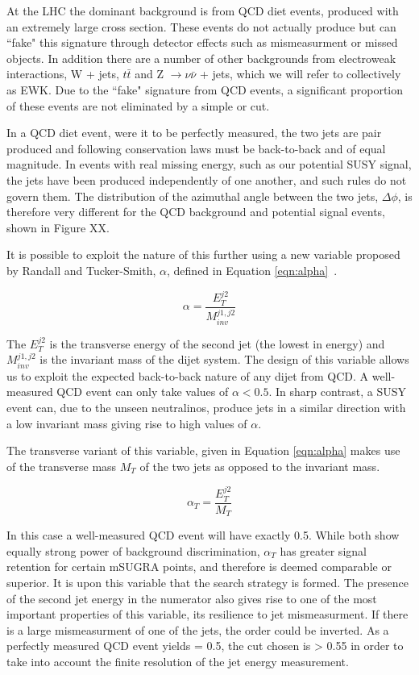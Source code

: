 At the LHC the dominant background is from QCD diet events, produced with an extremely large cross section. These events do not actually produce \met but can ``fake" this signature through detector effects such as mismeasurment or missed objects. In addition there are a number of other backgrounds from electroweak interactions, W + jets, $t \bar{t}$ and Z $\rightarrow \nu \bar{\nu}$ + jets, which we will refer to collectively as EWK. Due to the ``fake" \met signature from QCD events, a significant proportion of these events are not eliminated by a simple \met or \mht cut. 

In a QCD diet event, were it to be perfectly measured, the two jets are pair produced and following conservation laws must be back-to-back and of equal magnitude. In events with real missing energy, such as our potential SUSY signal, the jets have been produced independently of one another, and such rules do not govern them. The distribution of the azimuthal angle between the two jets, $\Delta \phi$, is therefore very different for the QCD background and potential signal events, shown in Figure XX. 


It is possible to exploit the nature of this further using a new variable proposed by Randall and Tucker-Smith, $\alpha$, defined in Equation \ref{eqn:alpha}~\cite{Randall}. 

\begin{equation}
\alpha = \frac{E_{T}^{j2}}{M_{inv}^{j1,j2}}
\label{eqn:alpha}
\end{equation}

The $E_{T}^{j2}$ is the transverse energy of the second jet (the lowest in energy) and $M_{inv}^{j1,j2}$ is the invariant mass of the dijet system. The design of this variable allows us to exploit the expected back-to-back nature of any dijet from QCD. A well-measured QCD event can only take values of $\alpha < 0.5$. In sharp contrast, a SUSY event can, due to the unseen neutralinos, produce jets in a similar direction with a low invariant mass giving rise to high values of $\alpha$.

The transverse variant of this variable, given in Equation \ref{eqn:alpha} makes use of the transverse mass $M_{T}$ of the two jets as opposed to the invariant mass.

\begin{equation}
\alpha_{T} = \frac{E_{T}^{j2}}{M_{T}} 
\label{eqn:alphat}
\end{equation}

In this case a well-measured QCD event will have exactly 0.5. While both show equally strong power of background discrimination, $\alpha_{T}$ has greater signal retention for certain mSUGRA points,\cite{PASaT} and therefore is deemed comparable or superior. It is upon this variable that the search strategy is formed. The presence of the second jet energy in the numerator also gives rise to one of the most important properties of this variable, its resilience to jet mismeasurment. If there is a large mismeasurment of one of the jets, the order could be inverted. As a perfectly measured QCD event yields \alt = 0.5, the cut chosen is \alt > 0.55 in order to take into account the finite resolution of the jet energy measurement.  


